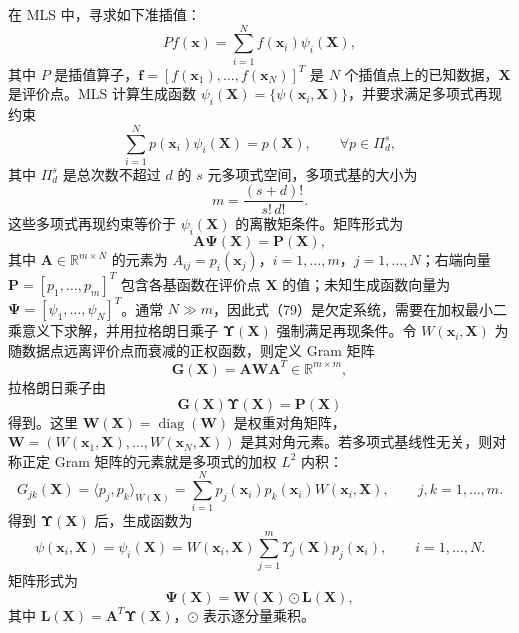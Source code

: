 \documentclass[UTF8,11pt,a4paper]{ctexart}
\newcommand{\R}{\mathbb{R}}
\begin{document}
在 MLS 中，寻求如下准插值：
\begin{equation}
P f(\bm x)=\sum_{i=1}^{N}f(\bm x_i)\psi_i(\bm X), \tag{77}
\end{equation}
其中 $P$ 是插值算子，$\bm f=[f(\bm x_1),\ldots,f(\bm x_N)]^T$ 是 $N$ 个插值点上的已知数据，$\bm X$ 是评价点。MLS 计算生成函数 $\psi_i(\bm X)=\{\psi(\bm x_i,\bm X)\}$，并要求满足多项式再现约束
\begin{equation}
\sum_{i=1}^{N}p(\bm x_i)\psi_i(\bm X)=p(\bm X),
\qquad \forall p\in\Pi_d^s, \tag{78}
\end{equation}
其中 $\Pi_d^s$ 是总次数不超过 $d$ 的 $s$ 元多项式空间，多项式基的大小为
\[
m=\frac{(s+d)!}{s!\,d!}.
\]
这些多项式再现约束等价于 $\psi_i(\bm X)$ 的离散矩条件。矩阵形式为
\begin{equation}
\bm A\bm\Psi(\bm X)=\bm P(\bm X), \tag{79}
\end{equation}
其中 $\bm A\in\R^{m\times N}$ 的元素为 $A_{ij}=p_i(\bm x_j)$，$i=1,\ldots,m$，$j=1,\ldots,N$；右端向量 $\bm P=[p_1,\ldots,p_m]^T$ 包含各基函数在评价点 $\bm X$ 的值；未知生成函数向量为 $\bm\Psi=[\psi_1,\ldots,\psi_N]^T$。通常 $N\gg m$，因此式（79）是欠定系统，需要在加权最小二乘意义下求解，并用拉格朗日乘子 $\bm\Upsilon(\bm X)$ 强制满足再现条件。令 $W(\bm x_i,\bm X)$ 为随数据点远离评价点而衰减的正权函数，则定义 Gram 矩阵
\[
\bm G(\bm X)=\bm A\bm W\bm A^T\in\R^{m\times m},
\]
拉格朗日乘子由
\begin{equation}
\bm G(\bm X)\bm\Upsilon(\bm X)=\bm P(\bm X) \tag{80}
\end{equation}
得到。这里 $\bm W(\bm X)=\operatorname{diag}(\bm W)$ 是权重对角矩阵，$\bm W=(W(\bm x_1,\bm X),\ldots,W(\bm x_N,\bm X))$ 是其对角元素。若多项式基线性无关，则对称正定 Gram 矩阵的元素就是多项式的加权 $L^2$ 内积：
\begin{equation}
G_{jk}(\bm X)=\langle p_j,p_k\rangle_{W(\bm X)}
=\sum_{i=1}^{N}p_j(\bm x_i)p_k(\bm x_i)W(\bm x_i,\bm X),
\qquad j,k=1,\ldots,m. \tag{81}
\end{equation}
得到 $\bm\Upsilon(\bm X)$ 后，生成函数为
\begin{equation}
\psi(\bm x_i,\bm X)=\psi_i(\bm X)
=W(\bm x_i,\bm X)\sum_{j=1}^{m}\Upsilon_j(\bm X)p_j(\bm x_i),
\qquad i=1,\ldots,N. \tag{82}
\end{equation}
矩阵形式为
\begin{equation}
\bm\Psi(\bm X)=\bm W(\bm X)\odot\bm L(\bm X), \tag{83}
\end{equation}
其中 $\bm L(\bm X)=\bm A^T\bm\Upsilon(\bm X)$，$\odot$ 表示逐分量乘积。
\end{document}

